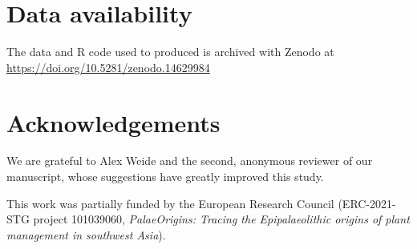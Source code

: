 \documentclass[
  authoryear,
  preprint]{elsarticle}
\begin{document}
\section{Data availability}\label{data-availability}

The data and R code used to produced is archived with Zenodo at
\url{https://doi.org/10.5281/zenodo.14629984}

\section{Acknowledgements}\label{acknowledgements}

We are grateful to Alex Weide and the second, anonymous reviewer of our
manuscript, whose suggestions have greatly improved this study.

This work was partially funded by the European Research Council
(ERC-2021-STG project 101039060, \emph{PalaeOrigins: Tracing the
Epipalaeolithic origins of plant management in southwest Asia}).


\renewcommand\refname{References}
  
\end{document}
